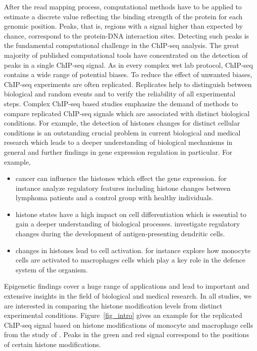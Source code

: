 After the read mapping process, computational methods have to be applied to estimate a discrete value reflecting the binding strength of the protein for each genomic position.
Peaks, that is, regions with a signal higher than expected by chance, correspond to the protein-DNA interaction sites.
Detecting such peaks is the fundamental computational challenge in the ChIP-seq analysis.
The great majority of published computational tools have concentrated on the detection of peaks in a single ChIP-seq signal.
As in every complex wet lab protocol, ChIP-seq contains a wide range of potential biases.
To reduce the effect of unwanted biases, ChIP-seq experiments are often replicated.
Replicates help to distinguish between biological and random events and to verify the reliability of all experimental steps.
Complex ChIP-seq based studies emphasize the demand of methods to compare replicated ChIP-seq signals which are associated with distinct biological conditions.
For example, the detection of histones changes for distinct cellular conditions is an outstanding crucial problem in current biological and medical research which leads to a deeper understanding of biological mechanisms in general and further findings in gene expression regulation in particular.
For example,
\begin{itemize}
 \item cancer can influence the histones which effect the gene expression.
 \cite{Koues2015} for instance analyze regulatory features including histone changes between lymphoma patients and a control group with healthy individuals.
 \item histone states have a high impact on cell differentiation which is essential to gain a deeper understanding of biological processes.
 \cite{Lin2015} investigate regulatory changes during the development of antigen-presenting dendritic cells.
 \item changes in histones lead to cell activation.
 \cite{Stunnenberg2014} for instance explore how monocyte cells are activated to macrophages cells which play a key role in the defence system of the organism. 
\end{itemize}

\noindent
Epigenetic findings cover a huge range of applications and lead to important and extensive insights in the field of biological and medical research.
In all studies, we are interested in comparing the histone modification levels from distinct experimental conditions.
Figure~\ref{fig_intro} gives an example for the replicated ChIP-seq signal based on histone modifications of monocyte and macrophage cells from the study of \cite{Stunnenberg2014}.
Peaks in the green and red signal correspond to the positions of certain histone modifications.

